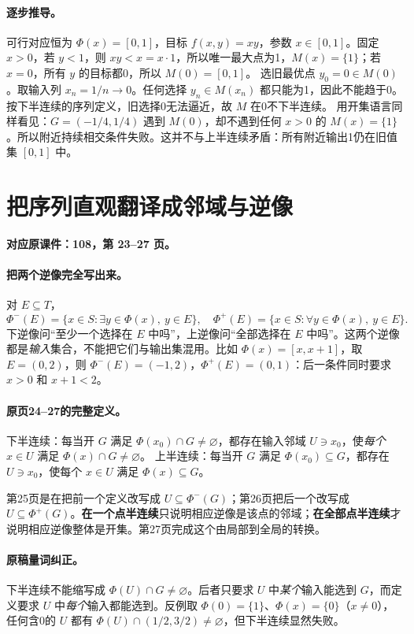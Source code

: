 \documentclass[11pt,a4paper]{article}
\theoremstyle{definition}\newtheorem{definition}{定义}\newtheorem{example}{例}
\begin{document}
\paragraph{逐步推导。}
可行对应恒为 $\Phi(x)=[0,1]$，目标 $f(x,y)=xy$，参数 $x\in[0,1]$。固定 $x>0$，若 $y<1$，则 $xy<x=x\cdot1$，所以唯一最大点为1，$M(x)=\{1\}$；若 $x=0$，所有 $y$ 的目标都0，所以 $M(0)=[0,1]$。
选旧最优点 $y_0=0\in M(0)$。取输入列 $x_n=1/n\to0$。任何选择 $y_n\in M(x_n)$ 都只能为1，因此不能趋于0。按下半连续的序列定义，旧选择0无法逼近，故 $M$ 在0不下半连续。
用开集语言同样看见：$G=(-1/4,1/4)$ 遇到 $M(0)$，却不遇到任何 $x>0$ 的 $M(x)=\{1\}$。所以附近持续相交条件失败。这并不与上半连续矛盾：所有附近输出1仍在旧值集 $[0,1]$ 中。


\clearpage\section{把序列直观翻译成邻域与逆像}\label{g:108:23}

\textbf{对应原课件：108，第 23--27 页。}


\paragraph{把两个逆像完全写出来。}
对 $E\subseteq T$，
\[\Phi^-(E)=\{x\in S:\exists y\in\Phi(x),\ y\in E\},\quad
\Phi^+(E)=\{x\in S:\forall y\in\Phi(x),\ y\in E\}.\]
下逆像问“至少一个选择在 $E$ 中吗”，上逆像问“全部选择在 $E$ 中吗”。这两个逆像都是\emph{输入}集合，不能把它们与输出集混用。比如 $\Phi(x)=[x,x+1]$，取 $E=(0,2)$，则 $\Phi^-(E)=(-1,2)$，$\Phi^+(E)=(0,1)$：后一条件同时要求 $x>0$ 和 $x+1<2$。
\paragraph{原页24--27的完整定义。}
下半连续：每当开 $G$ 满足 $\Phi(x_0)\cap G\ne\varnothing$，都存在输入邻域 $U\ni x_0$，使\emph{每个} $x\in U$ 满足 $\Phi(x)\cap G\ne\varnothing$。
上半连续：每当开 $G$ 满足 $\Phi(x_0)\subseteq G$，都存在 $U\ni x_0$，使每个 $x\in U$ 满足 $\Phi(x)\subseteq G$。

第25页是在把前一个定义改写成 $U\subseteq\Phi^-(G)$；第26页把后一个改写成 $U\subseteq\Phi^+(G)$。\textbf{在一个点半连续}只说明相应逆像是该点的邻域；\textbf{在全部点半连续}才说明相应逆像整体是开集。第27页完成这个由局部到全局的转换。

\paragraph{原稿量词纠正。}
下半连续不能缩写成 $\Phi(U)\cap G\ne\varnothing$。后者只要求 $U$ 中\emph{某个}输入能选到 $G$，而定义要求 $U$ 中\emph{每个}输入都能选到。反例取 $\Phi(0)=\{1\}$、$\Phi(x)=\{0\}$（$x\ne0$），任何含0的 $U$ 都有 $\Phi(U)\cap(1/2,3/2)\ne\varnothing$，但下半连续显然失败。
\end{document}
